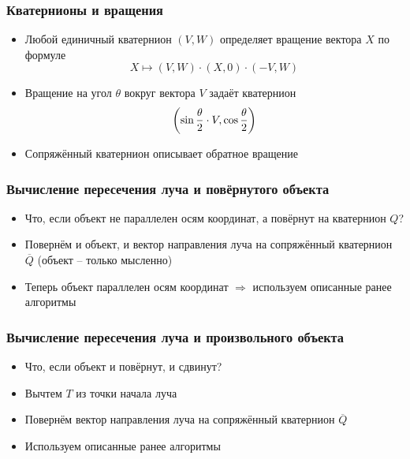 \documentclass[10pt]{beamer}
\begin{document}
\begin{frame}
\frametitle{Кватернионы и вращения}
\begin{itemize}
\item Любой единичный кватернион \begin{math}(V,W)\end{math} определяет вращение вектора \begin{math}X\end{math} по формуле
\begin{equation}
X \mapsto (V, W) \cdot (X, 0) \cdot (-V, W)
\end{equation}
\pause
\item Вращение на угол \begin{math}\theta\end{math} вокруг вектора \begin{math}V\end{math} задаёт кватернион
\begin{equation}
\left(\sin{\theta\over 2} \cdot V, \cos{\theta\over 2}\right)
\end{equation}
\pause
\item Сопряжённый кватернион описывает обратное вращение
\end{itemize}
\end{frame}

\begin{frame}
\frametitle{Вычисление пересечения луча и повёрнутого объекта}
\begin{itemize}
\item Что, если объект не параллелен осям координат, а повёрнут на кватернион \begin{math}Q\end{math}?
\pause
\item Повернём и объект, и вектор направления луча на сопряжённый кватернион \begin{math}\overline{Q}\end{math} (объект -- только мысленно)
\pause
\item Теперь объект параллелен осям координат \begin{math}\Longrightarrow\end{math} используем описанные ранее алгоритмы
\end{itemize}
\end{frame}

\begin{frame}
\frametitle{Вычисление пересечения луча и произвольного объекта}
\begin{itemize}
\item Что, если объект и повёрнут, и сдвинут?
\pause
\item Вычтем \begin{math}T\end{math} из точки начала луча
\pause
\item Повернём вектор направления луча на сопряжённый кватернион \begin{math}\overline{Q}\end{math}
\pause
\item Используем описанные ранее алгоритмы
\end{itemize}
\end{frame}
\end{document}
